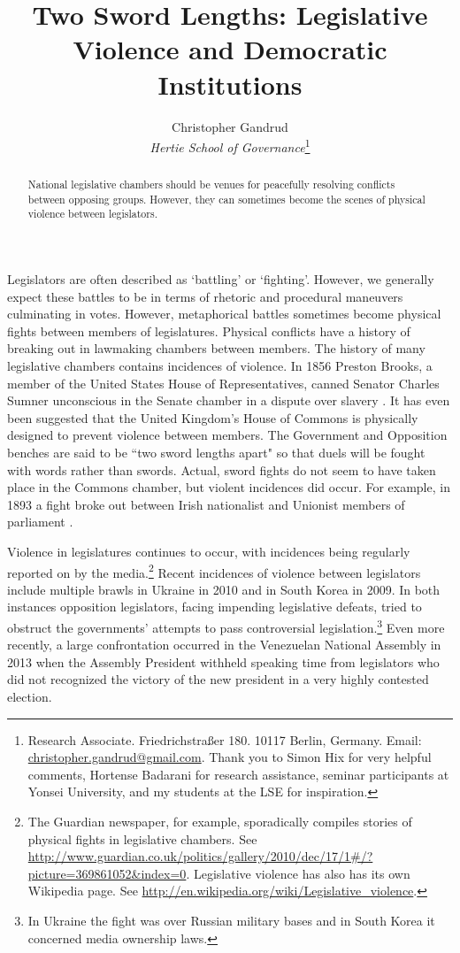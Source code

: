 \documentclass[a4paper]{article}\usepackage{graphicx, color}
\title{Two Sword Lengths: Legislative Violence and Democratic Institutions}
\author{Christopher Gandrud \\
                {\emph{Hertie School of Governance}}\footnote{Research Associate. Friedrichstra{\ss}er 180. 10117 Berlin, Germany. Email: \href{mailto:christopher.gandrud@gmail.com}{christopher.gandrud@gmail.com}. Thank you to Simon Hix for very helpful comments, Hortense Badarani for research assistance, seminar participants at Yonsei University, and my students at the LSE for inspiration.}}
\date{}
\begin{document}
\maketitle

\begin{abstract}
National legislative chambers should be venues for peacefully resolving conflicts between opposing groups. However, they can sometimes become the scenes of physical violence between legislators. 

\end{abstract}



Legislators are often described as `battling' or `fighting'. However, we generally expect these battles to be in terms of rhetoric and procedural maneuvers culminating in votes. However, metaphorical battles sometimes become physical fights between members of legislatures. Physical conflicts have a history of breaking out in lawmaking chambers between members. The history of many legislative chambers contains incidences of violence. In 1856 Preston Brooks, a member of the United States House of Representatives, canned Senator Charles Sumner unconscious in the Senate chamber in a dispute over slavery \citep{USSenateCanning}. It has even been suggested that the United Kingdom's House of Commons is physically designed to prevent violence between members. The Government and Opposition benches are said to be ``two sword lengths apart" \citep{ParliamentUKSword} so that duels will be fought with words rather than swords. Actual, sword fights do not seem to have taken place in the Commons chamber, but violent incidences did occur. For example, in 1893 a fight broke out between Irish nationalist and Unionist members of parliament \citep{ByrneViolence}. 

Violence in legislatures continues to occur, with incidences being regularly reported on by the media.\footnote{The Guardian newspaper, for example, sporadically compiles stories of physical fights in legislative chambers. See \url{http://www.guardian.co.uk/politics/gallery/2010/dec/17/1\#/?picture=369861052\&index=0}. Legislative violence has also has its own Wikipedia page. See \url{http://en.wikipedia.org/wiki/Legislative_violence}.} Recent incidences of violence between legislators include multiple brawls in Ukraine in 2010 and in South Korea in 2009. In both instances opposition legislators, facing impending legislative defeats, tried to obstruct the governments' attempts to pass controversial legislation.\footnote{In Ukraine the fight was over Russian military bases and in South Korea it concerned media ownership laws.} Even more recently, a large confrontation occurred in the Venezuelan National Assembly in 2013 when the Assembly President withheld speaking time from legislators who did not recognized the victory of the new president in a very highly contested election.
\end{document}
